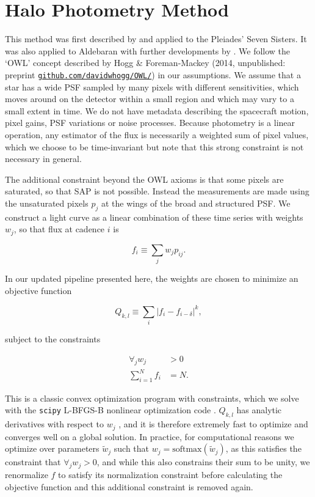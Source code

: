 \documentclass[modern]{aastex62}
\begin{document}
\newpage 

\section{Halo Photometry Method}
\label{method}


This method was first described by \citet{White2017} and applied to the Pleiades' Seven Sisters. It was also applied to Aldebaran with further developments by \citet{Farr2018}. We follow the `OWL' concept described by Hogg \&  Foreman-Mackey (2014, unpublished: preprint  \href{https://github.com/davidwhogg/OWL/}{\nolinkurl{github.com/davidwhogg/OWL/}}) in our assumptions. We assume that a star has a wide PSF sampled by many pixels with different sensitivities, which moves around on the detector within a small region and which may vary to a small extent in time. We do not have metadata describing the spacecraft motion, pixel gains, PSF variations or noise processes. Because photometry is a linear operation, any estimator of the flux is necessarily a weighted sum of pixel values, which we choose to be time-invariant but note that this strong constraint is not necessary in general. 

The additional constraint beyond the OWL axioms is that some pixels are saturated, so that SAP is not possible. Instead the measurements are made using the unsaturated pixels $p_j$ at the wings of the broad and structured PSF. We construct a light curve as a linear combination of these time series with weights $w_j$, so that flux at cadence $i$ is 

\begin{equation}
    f_i \equiv \sum_j {w_j p_{ij}}.
\end{equation}

\noindent In our updated pipeline presented here, the weights are chosen to minimize an objective function

\begin{equation}
    Q_{k,l} \equiv {\sum_i{|f_i - f_{i-\delta}|^k}},
\end{equation}

\noindent subject to the constraints 

\begin{align}
\forall_j w_j &> 0\\
\sum_{i=1}^{N} f_i  &= N.
\end{align}

This is a classic convex optimization program with constraints, which we solve with the \texttt{scipy} \citep{scipy} L-BFGS-B nonlinear optimization code \citep{lbfgsb}. $Q_{k,l}$ has analytic derivatives with respect to $w_j$ \citep[calculated with \texttt{autograd};][]{autograd}, and it is therefore extremely fast to optimize and converges well on a global solution. In practice, for computational reasons we optimize over parameters $\tilde{w}_j$ such that $w_j = \text{softmax}(\tilde{w}_j)$, as this satisfies the constraint that $\forall_j w_j > 0$, and while this also constrains their sum to be unity, we renormalize $f$ to satisfy its normalization constraint before calculating the objective function and this additional constraint is removed again.
\end{document}
